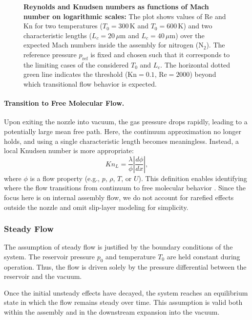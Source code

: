 	\begin{figure}[H]
		\centering
		
		\caption[Reynolds and Knudsen numbers as functions of Mach number on logarithmic scales.]{
			\textbf{Reynolds and Knudsen numbers as functions of Mach number on logarithmic scales:}
			The plot shows values of $\mathrm{Re}$ and $\mathrm{Kn}$ for two temperatures ($T_0 = 300\,\mathrm{K}$ and $T_0 = 600\,\mathrm{K}$) and two characteristic lengths ($L_c = 20\,\mu\mathrm{m}$ and $L_c = 40\,\mu\mathrm{m}$) over the expected Mach numbers inside the assembly for nitrogen ($\text{N}_2$).
			The reference pressure $p_\mathrm{ref}$ is fixed and chosen such that it corresponds to the limiting cases of the considered $T_0$ and $L_c$.
			The horizontal dotted green line indicates the threshold ($\mathrm{Kn} = 0.1$, $\mathrm{Re} = 2000$) beyond which transitional flow behavior is expected.
		}
		\label{fig:knudsen-reynolds-plot}
	\end{figure}

	\paragraph{Transition to Free Molecular Flow.}
		Upon exiting the nozzle into vacuum, the gas pressure drops rapidly, leading to a potentially large mean free path.
		Here, the continuum approximation no longer holds, and using a single characteristic length becomes meaningless.
		Instead, a local Knudsen number is more appropriate:
		\begin{equation}
		  Kn_L
		  = \frac{\lambda}{\phi}\left|\frac{d\phi}{dx}\right|,
		\end{equation}
		where \(\phi\) is a flow property (e.g., \(p\), \(\rho\), \(T\), or \(U\)).
		This definition enables identifying where the flow transitions from continuum to free molecular behavior \cite{bird_dsmc_2013,Grabe2008,LiLam1964}.
		Since the focus here is on internal assembly flow, we do not account for rarefied effects outside the nozzle and omit slip-layer modeling for simplicity.

\subsubsection*{Steady Flow}
	The assumption of steady flow is justified by the boundary conditions of the system.
	The reservoir pressure $p_0$ and temperature $T_0$ are held constant during operation.
	Thus, the flow is driven solely by the pressure differential between the reservoir and the vacuum.

	Once the initial unsteady effects have decayed, the system reaches an equilibrium state in which the flow remains steady over time.
	This assumption is valid both within the assembly and in the downstream expansion into the vacuum.
	\cite{LiLam1964}
